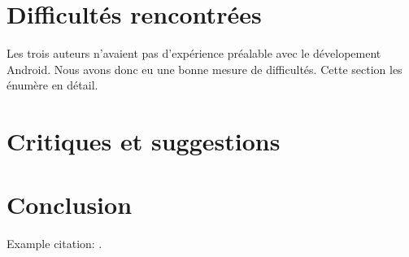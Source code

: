\documentclass[12pt]{article}
\begin{document}
\section{Difficultés rencontrées}

Les trois auteurs n'avaient pas d'expérience préalable avec le dévelopement
Android.  Nous avons donc eu une bonne mesure de difficultés.  Cette section les
énumère en détail.



\section{Critiques et suggestions}
\section{Conclusion}
Example citation: .



\end{document}
